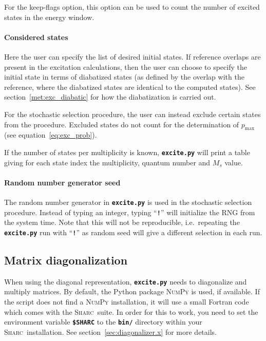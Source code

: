 \documentclass[a4paper,10pt,DIV=15,openany,twoside=false]{scrbook}
\newcommand{\sharc}{\textsc{Sharc}}
\newcommand{\ttt}[1]{\textbf{\texttt{#1}}}
\begin{document}
For the keep-flags option, this option can be used to count the number of excited states in the energy window.

\paragraph{Considered states}

Here the user can specify the list of desired initial states. 
If reference overlaps are present in the excitation calculations, then the user can choose to specify the initial state in terms of diabatized states (as defined by the overlap with the reference, where the diabatized states are identical to the computed states).
See section~\ref{met:exc_diabatic} for how the diabatization is carried out.

For the stochastic selection procedure, the user can instead exclude certain states from the procedure. Excluded states do not count for the determination of $p_\text{max}$ (see equation~\eqref{eq:exc_prob}).

If the number of states per multiplicity is known, \ttt{excite.py} will print a table giving for each state index the multiplicity, quantum number and $M_s$ value.


\paragraph{Random number generator seed}

The random number generator in \ttt{excite.py} is used in the stochastic selection procedure. Instead of typing an integer, typing ``\ttt{!}'' will initialize the RNG from the system time. Note that this will not be reproducible, i.e.\ repeating the \ttt{excite.py} run with ``\ttt{!}'' as random seed will give a different selection in each run.



\subsection{Matrix diagonalization}

When using the diagonal representation, \ttt{excite.py} needs to diagonalize and multiply matrices. By default, the Python package \textsc{NumPy} is used, if available. If the script does not find a \textsc{NumPy} installation, it will use a small Fortran code which comes with the \sharc\ suite. In order for this to work, you need to set the environment variable \ttt{\$SHARC} to the \ttt{bin/} directory within your \sharc\ installation. See section~\ref{sec:diagonalizer.x} for more details.
\end{document}

